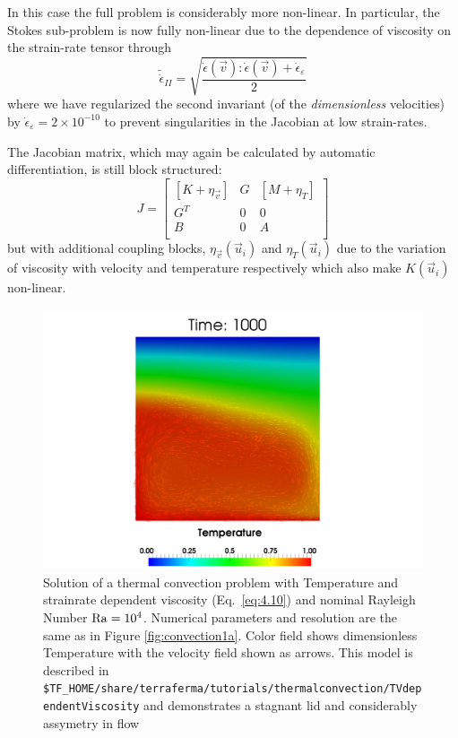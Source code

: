In this case the full problem is considerably more non-linear.  In
particular, the Stokes sub-problem is now fully non-linear due to the
dependence of viscosity on the strain-rate tensor through
\begin{equation}
\tilde{\dot{\epsilon}}_{II} = \sqrt{\frac{\dot{\epsilon}(\vec{v}):\dot{\epsilon}(\vec{v}) + \dot{\epsilon}_{\varepsilon}}{2}}
\end{equation}
where we have regularized the second invariant (of the
\emph{dimensionless} velocities) by
$\dot{\epsilon}_{\varepsilon} = 2\times10^{-10}$ to prevent
singularities in the Jacobian at low strain-rates.

The Jacobian matrix, which may again be calculated by automatic differentiation, is still block structured:
\begin{equation}
  \label{eq:TVJacobian}
  J =  \left[
\begin{array}{ccc}
  \left[K + \eta_{\vec{v}}\right] & G  & \left[M + \eta_{T}\right] \\
  G^{T} & 0 & 0 \\
  B & 0 & A \\ 
  \end{array}
  \right]
\end{equation}
but with additional coupling blocks, $\eta_{\vec{v}}(\vec{u}_i)$ and $\eta_{T}(\vec{u}_i)$ due to the variation of viscosity with velocity
and temperature respectively which also make $K(\vec{u}_i)$ non-linear.  
\begin{figure}[htbp!]
  \centering
  \includegraphics[width=.9\textwidth]{figures/convection_TVdependent_TV.png}
  \caption{Solution of a thermal convection problem with Temperature
    and strainrate dependent viscosity (Eq.~\ref{eq:4.10}) and  nominal Rayleigh Number
    $\mathrm{Ra}=10^{4}$. Numerical parameters and resolution are the same as
    in Figure \ref{fig:convection1a}. Color field shows dimensionless
    Temperature with the velocity field shown as arrows. This model is   described in
    \texttt{\$TF\_HOME/share/terraferma/tutorials/thermalconvection/TVdependentViscosity}
  and demonstrates a stagnant lid and considerably assymetry in flow}
  \label{fig:convectionTVdepVisc}
\end{figure}

